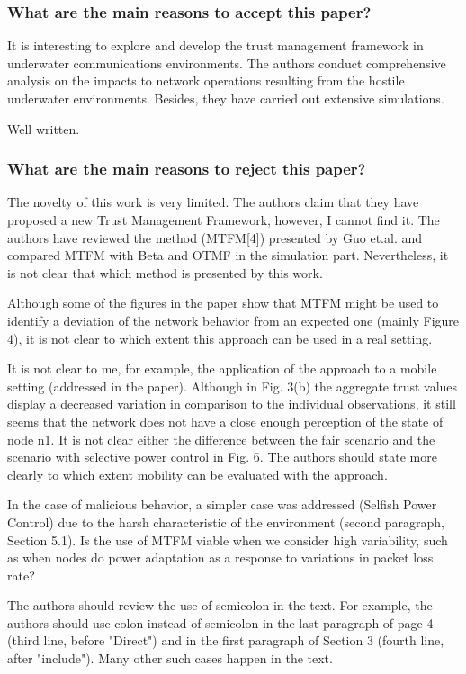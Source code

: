 \documentclass[runningheads,a4paper]{llncs}
\begin{document}
\subsubsection{What are the main reasons to accept this paper?}

It is interesting to explore and develop the trust management framework in underwater communications environments. The authors conduct comprehensive analysis on the impacts to network operations resulting from the hostile underwater environments. Besides, they have carried out extensive simulations.

Well written.

\subsubsection{What are the main reasons to reject this paper?}

The novelty of this work is very limited. The authors claim that they have proposed a new Trust Management Framework, however, I cannot find it. The authors have reviewed the method (MTFM[4]) presented by Guo et.al. and compared MTFM with Beta and OTMF in the simulation part. Nevertheless, it is not clear that which method is presented by this work.

Although some of the figures in the paper show that MTFM might be used to identify a deviation of the network behavior from an expected one (mainly Figure 4), it is not clear to which extent this approach can be used in a real setting.

It is not clear to me, for example, the application of the approach to a mobile setting (addressed in the paper). Although in Fig. 3(b) the aggregate trust values display a decreased variation in comparison to the individual observations, it still seems that the network does not have a close enough perception of the state of node n1. It is not clear either the difference between the fair scenario and the scenario with selective power control in Fig. 6. The authors should state more clearly to which extent mobility can be evaluated with the approach.

In the case of malicious behavior, a simpler case was addressed (Selfish Power Control) due to the harsh characteristic of the environment (second paragraph, Section 5.1). Is the use of MTFM viable when we consider high variability, such as when nodes do power adaptation as a response to variations in packet loss rate? 

The authors should review the use of semicolon in the text. For example, the authors should use colon instead of semicolon in the last paragraph of page 4 (third line, before "Direct") and in the first paragraph of Section 3 (fourth line, after "include"). Many other such cases happen in the text.
\end{document}
